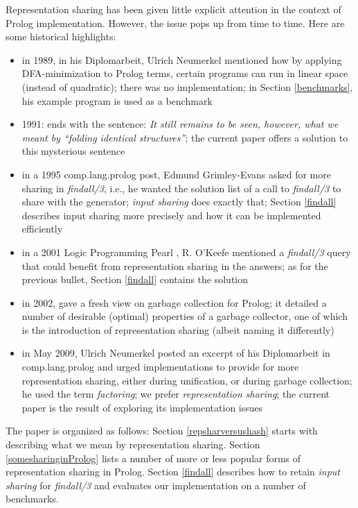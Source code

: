 \documentclass{tlp}
\begin{document}
\begin{sloppypar}
Representation sharing has been given little explicit attention in the
context of Prolog implementation. However, the issue pops up from time
to time. Here are some historical highlights:
\begin{itemize}
\item
in 1989, in his Diplomarbeit, Ulrich Neumerkel
\cite{neumerkeldiplomarbeit} mentioned how by applying DFA-minimization
to Prolog terms, certain programs can run in linear space (instead of
quadratic); there was no implementation; in Section \ref{benchmarks}, his
example program is used as a benchmark
\item
1991: \cite{VariableShunting} ends with the sentence: {\em It still
remains to be seen, however, what we meant by ``folding identical
structures''}; the current paper offers a solution to this mysterious
sentence
\item
in a 1995 comp.lang.prolog post, Edmund Grimley-Evans
\cite{findall1archive} asked for more sharing in {\em findall/3}, i.e., he
wanted the solution list of a call to {\em findall/3} to share with
the generator; {\em input sharing} \cite{findallwithoutfindall} does
exactly that; Section \ref{findall} describes input sharing more
precisely and how it can be implemented efficiently
\item
in a 2001 Logic Programming Pearl \cite{OKeefePearl}, R. O'Keefe
mentioned a {\em findall/3} query that could benefit from representation
sharing in the answers; as for the previous bullet, Section
\ref{findall} contains the solution
\item
in 2002, \cite{DemoenICLP2002fresh} gave a fresh view on garbage
collection for Prolog; it detailed a number of desirable (optimal)
properties of a garbage collector, one of which is the introduction of
representation sharing (albeit naming it differently)
\item
in May 2009, Ulrich Neumerkel posted an excerpt of his Diplomarbeit in
comp.lang.prolog and urged implementations to provide for more
representation sharing, either during unification, or during garbage
collection; he used the term {\em factoring}; we prefer {\em
  representation sharing}; the current paper is the result of
exploring its implementation issues
\end{itemize}
\end{sloppypar}


The paper is organized as follows: Section \ref{repsharversushash}
starts with describing what we mean by representation sharing. Section
\ref{somesharinginProlog} lists a number of more or less popular forms
of representation sharing in Prolog. Section \ref{findall} describes
how to retain {\em input sharing} for {\em findall/3} and evaluates our
implementation on a number of benchmarks.
\end{document}
